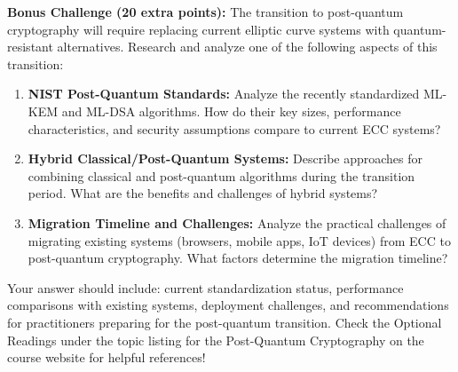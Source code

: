 \documentclass[10pt,a4paper,american]{article}
\begin{document}
\begin{tcolorbox}[colframe=EarthBrown!30!white,colback=EarthBrown!5!white]
	\textbf{Bonus Challenge (20 extra points):} The transition to post-quantum cryptography will require replacing current elliptic curve systems with quantum-resistant alternatives. Research and analyze one of the following aspects of this transition:
	\begin{enumerate}
		\item \textbf{NIST Post-Quantum Standards:} Analyze the recently standardized ML-KEM and ML-DSA algorithms. How do their key sizes, performance characteristics, and security assumptions compare to current ECC systems?
		\item \textbf{Hybrid Classical/Post-Quantum Systems:} Describe approaches for combining classical and post-quantum algorithms during the transition period. What are the benefits and challenges of hybrid systems?
		\item \textbf{Migration Timeline and Challenges:} Analyze the practical challenges of migrating existing systems (browsers, mobile apps, IoT devices) from ECC to post-quantum cryptography. What factors determine the migration timeline?
	\end{enumerate}
	Your answer should include: current standardization status, performance comparisons with existing systems, deployment challenges, and recommendations for practitioners preparing for the post-quantum transition. Check the Optional Readings under the topic listing for the Post-Quantum Cryptography on the course website for helpful references!
\end{tcolorbox}
\end{document}
